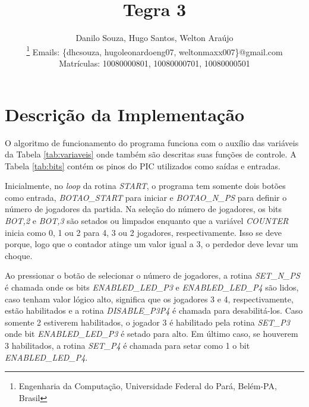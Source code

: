 \documentclass[article]{IEEEtran}
\begin{document}
\title{Tegra 3}

\author{Danilo Souza, Hugo Santos, Welton Ara\'ujo

\thanks{Engenharia da Computa\c{c}\~ao, Universidade Federal do Par\'a, Bel\'em-PA, Brasil}
Emails: \{dhcsouza, hugoleonardoeng07, weltonmaxx007\}@gmail.com\\
Matr\'iculas: 10080000801, 10080000701, 10080000501}

\maketitle

\begin{abstract}

\end{abstract}

\begin{IEEEkeywords}

\end{IEEEkeywords}

\IEEEpeerreviewmaketitle



\section{Descrição da Implementação}

O algoritmo de funcionamento do programa funciona com o auxílio das variáveis da Tabela \ref{tab:variaveis} onde também são descritas suas funções de controle. A Tabela \ref{tab:bits} contém os pinos do PIC utilizados como saídas e entradas.

Inicialmente, no \textit{loop} da rotina \textit{START}, o programa tem somente dois botões como entrada, \textit{BOTAO\_START} para iniciar e \textit{BOTAO\_N\_PS} para definir o número de jogadores da partida. Na seleção do número de jogadores, os bits \textit{BOT,2} e \textit{BOT,3} são setados ou limpados enquanto que a variável \textit{COUNTER} inicia como 0, 1 ou 2 para 4, 3 ou 2 jogadores, respectivamente. Isso se deve porque, logo que o contador atinge um valor igual a 3, o perdedor deve levar um choque.

Ao pressionar o botão de selecionar o número de jogadores, a rotina \textit{SET\_N\_PS} é chamada onde os bits \textit{ENABLED\_LED\_P3} e \textit{ENABLED\_LED\_P4} são lidos, caso tenham valor lógico alto, significa que os jogadores 3 e 4, respectivamente, estão habilitados e a rotina \textit{DISABLE\_P3P4} é chamada para desabilitá-los. Caso somente 2 estiverem habilitados, o jogador 3 é habilitado pela rotina \textit{SET\_P3} onde bit \textit{ENABLED\_LED\_P3} é setado para alto. Em último caso, se houverem 3 habilitados, a rotina \textit{SET\_P4} é chamada para setar como 1 o bit \textit{ENABLED\_LED\_P4}.
\end{document}

